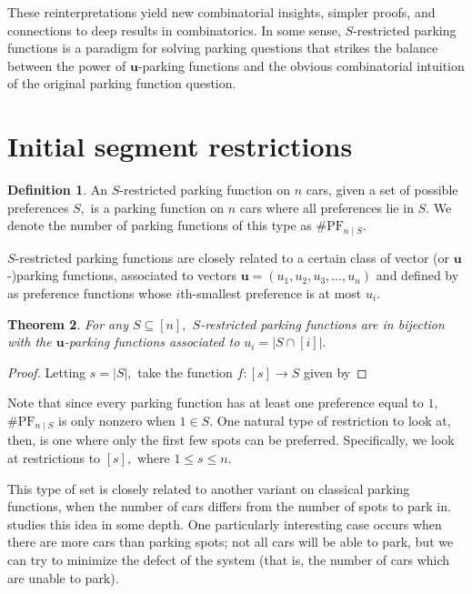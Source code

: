 \documentclass[12 pt]{amsart}
\newtheorem{theorem}{Theorem}[section]
\theoremstyle{definition} %
\newtheorem{definition}[theorem]{Definition}
\theoremstyle{remark} %
\begin{document}
These reinterpretations yield new combinatorial insights, simpler proofs, and connections to deep results in combinatorics. In some sense, $S$-restricted parking functions is a paradigm for solving parking questions that strikes the balance between the power of $\mathbf{u}$-parking functions and the obvious combinatorial intuition of the original parking function question.

\section{Initial segment restrictions}

\begin{definition}
    An $S$-restricted parking function on $n$ cars, given a set of possible preferences $S,$ is a parking function on $n$ cars where all preferences lie in $S.$ We denote the number of parking functions of this type as $\# \mathrm{PF}_{n\mid S}.$
\end{definition}

$S$-restricted parking functions are closely related to a certain class of vector (or $\mathbf{u}$-)parking functions, associated to vectors $\mathbf{u}=(u_1,u_2,u_3,\ldots,u_n)$ and defined by \cite{} as preference functions whose $i$th-smallest preference is at most $u_i.$

\begin{theorem}
    For any $S\subseteq[n],$ $S$-restricted parking functions are in bijection with the $\mathbf{u}$-parking functions associated to $u_i=|S\cap [i]|.$
\end{theorem}

\begin{proof}
    Letting $s=|S|,$ take the function $f:[s]\to S$ given by 
\end{proof}

Note that since every parking function has at least one preference equal to $1,$ $\# \mathrm{PF}_{n\mid S}$ is only nonzero when $1\in S.$ One natural type of restriction to look at, then, is one where only the first few spots can be preferred. Specifically, we look at restrictions to $[s],$ where $1\le s\le n.$

This type of set is closely related to another variant on classical parking functions, when the number of cars differs from the number of spots to park in. \cite{cameron-johannsen-prellberg-schweitzer-2008} studies this idea in some depth. One particularly interesting case occurs when there are more cars than parking spots; not all cars will be able to park, but we can try to minimize the defect of the system (that is, the number of cars which are unable to park).
\end{document}

